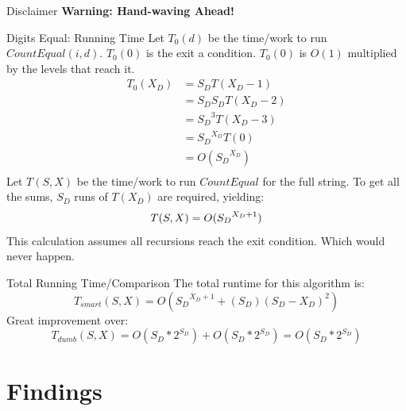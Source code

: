 \documentclass[10pt]{beamer}
\begin{document}
\begin{frame}{Disclaimer}
  \Huge \textbf{Warning: Hand-waving Ahead!}
\end{frame}

\begin{frame}{Digits Equal: Running Time}
  Let $T_{0}(d)$ be the time/work to run $CountEqual(i, d)$.
  $T_{0}(0)$ is the exit a condition.
  $T_{0}(0)$ is $O(1)$ multiplied by the levels that reach it. \\
  \begin{align*}
    T_{0}(X_{D}) &= S_{D}T(X_{D} - 1) \\
         &= S_{D}S_{D}T(X_{D} - 2) \\
         &= {S_{D}}^{3}T(X_{D} - 3) \\
         &= {S_{D}}^{X_{D}}T(0) \\
         &= O({S_{D}}^{X_{D}}) \\
  \end{align*}
  Let $T(S, X)$ be the time/work to run $CountEqual$ for the full string.
  To get all the sums, $S_{D}$ runs of $T(X_{D})$ are required, yielding:
  \begin{equation*}
    T(S, X) = O({S_{D}}^{X_{D} + 1}) \\
  \end{equation*}
  This calculation assumes all recursions reach the exit condition.
  Which would never happen.
\end{frame}

\begin{frame}{Total Running Time/Comparison}
  The total runtime for this algorithm is:
  \begin{equation*}
    T_{smart}(S, X) = O({S_{D}}^{X_{D} + 1} + (S_{D})(S_{D} - X_D)^{2})
  \end{equation*}
  Great improvement over:
  \begin{equation*}
    T_{dumb}(S, X) = O(S_{D}*2^{S_{D}}) + O(S_{D}*2^{S_{D}}) = O(S_{D}*2^{S_{D}})
  \end{equation*}
\end{frame}

\section{Findings}
\end{document}

